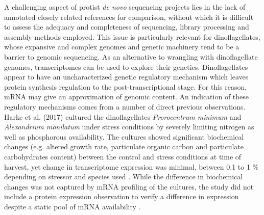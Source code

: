 \documentclass[12pt]{article}
\begin{document}
A challenging aspect of protist \textit{de novo} sequencing projects lies in the lack of annotated closely related references for comparison, without which it is difficult to assess the  adequacy and completeness of sequencing, library processing and assembly methods employed.
This issue is particularly relevant for dinoflagellates, whose expansive and complex genomes and genetic machinery tend to be a barrier to genomic sequencing. 
As an alternative to wrangling with dinoflagellate genomes, transcriptomes can be used to explore their genetics. %
Dinoflagellates appear to have an uncharacterized genetic regulatory mechanism which leaves protein synthesis regulation to the post-transcriptional stage. 
For this reason, mRNA may give an approximation of genomic content. 
An indication of these regulatory mechanisms comes from a number of direct previous observations. 
Harke et al. (2017) cultured the dinoflagellates \textit{Prorocentrum minimum} and \textit{Alexandrium monilatum} under stress conditions by severely limiting nitrogen as well as phosphorous availability. 
The cultures showed significant biochemical changes (e.g. altered growth rate, particulate organic carbon and particulate carbohydrates content) between the control and stress conditions at time of harvest, yet change in transcriptome expression was minimal, between 0.1 to 1 \% depending on stressor and species used \cite{harke2017conserved}. 
While the difference in biochemical changes was not captured by mRNA profiling of the cultures, the study did not include a protein expression observation to verify a difference in expression despite a static pool of mRNA availability \cite{harke2017conserved}.
\end{document}
